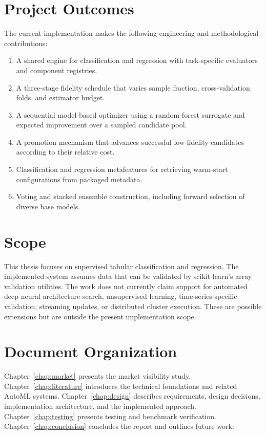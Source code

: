 \documentclass[12pt,a4paper,oneside]{report}
\begin{document}
\section{Project Outcomes}

The current implementation makes the following engineering and methodological
contributions:

\begin{enumerate}[leftmargin=*]
  \item A shared engine for classification and regression with task-specific
        evaluators and component registries.
  \item A three-stage fidelity schedule that varies sample fraction,
        cross-validation folds, and estimator budget.
  \item A sequential model-based optimizer using a random-forest surrogate and
        expected improvement over a sampled candidate pool.
  \item A promotion mechanism that advances successful low-fidelity candidates
        according to their relative cost.
  \item Classification and regression metafeatures for retrieving warm-start
        configurations from packaged metadata.
  \item Voting and stacked ensemble construction, including forward selection
        of diverse base models.
\end{enumerate}

\section{Scope}

This thesis focuses on supervised tabular classification and regression. The
implemented system assumes data that can be validated by scikit-learn's array
validation utilities. The work does not currently claim support for automated
deep neural architecture search, unsupervised learning, time-series-specific
validation, streaming updates, or distributed cluster execution. These are
possible extensions but are outside the present implementation scope.

\section{Document Organization}

Chapter~\ref{chap:market} presents the market visibility study.
Chapter~\ref{chap:literature} introduces the technical foundations and related
AutoML systems. Chapter~\ref{chap:design} describes requirements, design
decisions, implementation architecture, and the implemented approach.
Chapter~\ref{chap:testing} presents testing and benchmark verification.
Chapter~\ref{chap:conclusion} concludes the report and outlines future work.
\end{document}
